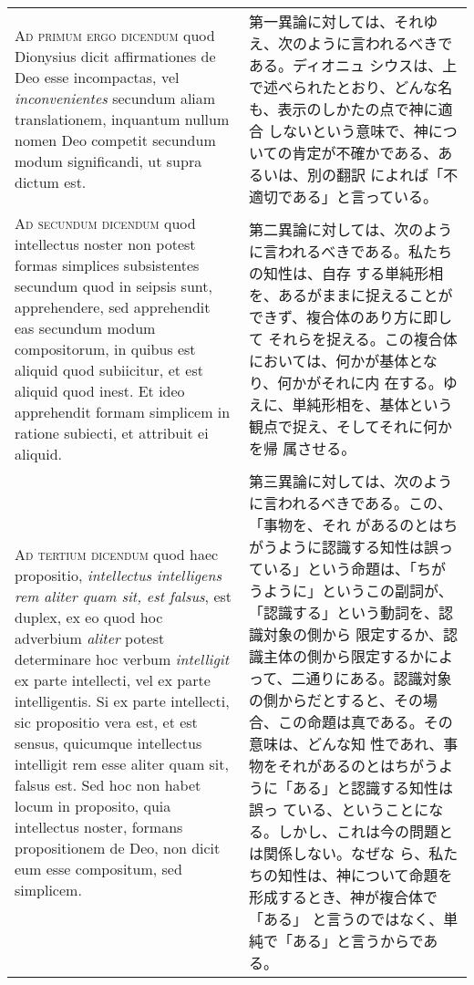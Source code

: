 \documentclass[paper=a4paper,fontsize=10pt,jafontsize=9pt,titlepage]{jlreq}
\begin{document}
\begin{longtable}{p{21em}p{21em}}
{\scshape Ad primum ergo dicendum} quod Dionysius dicit affirmationes
de Deo esse incompactas, vel {\itshape inconvenientes} secundum aliam
translationem, inquantum nullum nomen Deo competit secundum modum
significandi, ut supra dictum est.

&

第一異論に対しては、それゆえ、次のように言われるべきである。ディオニュ
シウスは、上で述べられたとおり、どんな名も、表示のしかたの点で神に適合
しないという意味で、神についての肯定が不確かである、あるいは、別の翻訳
によれば「不適切である」と言っている。

\\

{\scshape Ad secundum dicendum} quod intellectus noster non potest
formas simplices subsistentes secundum quod in seipsis sunt,
apprehendere, sed apprehendit eas secundum modum compositorum, in
quibus est aliquid quod subiicitur, et est aliquid quod inest. Et ideo
apprehendit formam simplicem in ratione subiecti, et attribuit ei
aliquid.

&

第二異論に対しては、次のように言われるべきである。私たちの知性は、自存
する単純形相を、あるがままに捉えることができず、複合体のあり方に即して
それらを捉える。この複合体においては、何かが基体となり、何かがそれに内
在する。ゆえに、単純形相を、基体という観点で捉え、そしてそれに何かを帰
属させる。

\\

{\scshape Ad tertium dicendum} quod haec propositio, {\itshape
intellectus intelligens rem aliter quam sit, est falsus}, est duplex,
ex eo quod hoc adverbium {\itshape aliter} potest determinare hoc
verbum {\itshape intelligit} ex parte intellecti, vel ex parte
intelligentis. Si ex parte intellecti, sic propositio vera est, et est
sensus, quicumque intellectus intelligit rem esse aliter quam sit,
falsus est. Sed hoc non habet locum in proposito, quia intellectus
noster, formans propositionem de Deo, non dicit eum esse compositum,
sed simplicem.

&

第三異論に対しては、次のように言われるべきである。この、「事物を、それ
があるのとはちがうように認識する知性は誤っている」という命題は、「ちが
うように」というこの副詞が、「認識する」という動詞を、認識対象の側から
限定するか、認識主体の側から限定するかによって、二通りにある。認識対象
の側からだとすると、その場合、この命題は真である。その意味は、どんな知
性であれ、事物をそれがあるのとはちがうように「ある」と認識する知性は誤っ
ている、ということになる。しかし、これは今の問題とは関係しない。なぜな
ら、私たちの知性は、神について命題を形成するとき、神が複合体で「ある」
と言うのではなく、単純で「ある」と言うからである。


\end{longtable}
\end{document}

